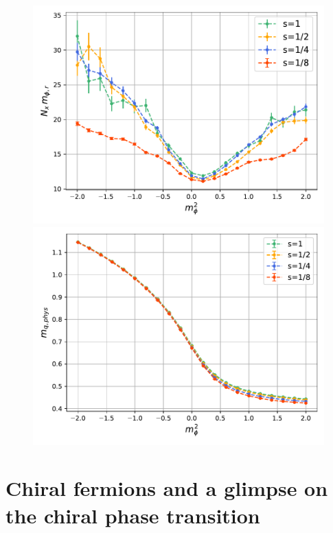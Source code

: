 \begin{figure}
    \begin{minipage}{0.45\textwidth}
        \includegraphics[scale=0.45]{figures/cooling/mass_scan/mphir.pdf}
    \end{minipage}
    \hfill 
    \begin{minipage}{0.45\textwidth}
        \includegraphics[scale=0.45]{figures/cooling/mass_scan/mqphys.pdf}
    \end{minipage}
\end{figure}


\newpage



\newpage
\section{Chiral fermions and a glimpse on the chiral phase transition}
\label{sec:chiral_PT}

